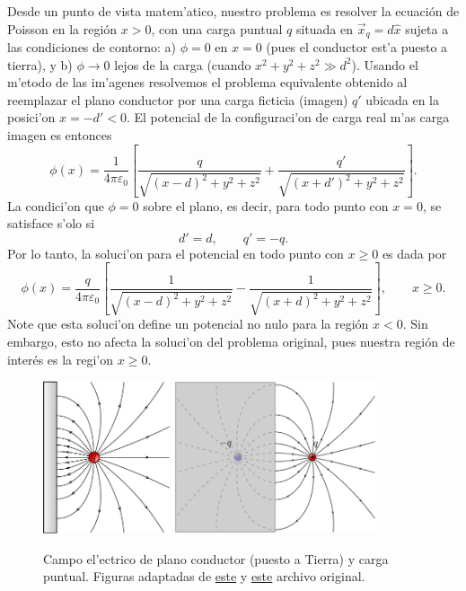 Desde un punto de vista matem'atico, nuestro problema es resolver la ecuación de Poisson en la región $x>0$, con una carga puntual $q$ situada en $\vec{x}_q=d\hat{x}$ sujeta a las condiciones de contorno: a) $\phi = 0 $ en $x=0$ (pues el conductor est'a puesto a tierra), y b) $\phi\rightarrow 0$ lejos de la carga (cuando $x^2 + y^2 + z^2 \gg d^2$). Usando el m'etodo de las im'agenes resolvemos el problema equivalente obtenido al reemplazar el plano conductor por una carga ficticia (imagen) $q'$ ubicada en la posici'on $x=-d'<0$. El potencial de la configuraci'on de carga real m'as carga imagen es entonces
\begin{equation}
 \phi(x)=\frac{1}{4\pi\varepsilon_0}\left[\frac{q}{\sqrt{(x-d)^2+y^2+z^2}}+\frac
{q'}{\sqrt{(x+d')^2+y^2+z^2}}\right].
\end{equation}
La condici'on que $\phi=0$ sobre el plano, es decir, para todo punto con $x=0$,
se satisface s'olo si
\begin{equation}
 d'=d, \qquad q'=-q.
\end{equation}
Por lo tanto, la soluci'on para el potencial en todo punto con $x\ge 0$ es dada por
\begin{equation}
 \phi(x)=\frac{q}{4\pi\varepsilon_0}\left[\frac{1}{\sqrt{(x-d)^2+y^2+z^2}}-\frac
{1}{\sqrt{(x+d)^2+y^2+z^2}}\right], \qquad x\ge 0.
\end{equation}
Note que esta soluci'on define un potencial no nulo para la región $x < 0$. Sin embargo, esto no afecta la soluci'on del problema original, pues nuestra región de interés es la regi'on $x \ge 0$.
\begin{center}
\begin{figure}[H]
\centerline{\includegraphics[height=4.5cm]{fig/fig-metodo-imagen-plano-01.pdf}
\hspace{2cm}
\includegraphics[height=4.5cm]{fig/fig-metodo-imagen-plano-02.pdf}}
\caption{Campo el'ectrico de plano conductor (puesto a Tierra) y carga puntual. 
Figuras adaptadas de  \href{http://commons.wikimedia.org/wiki/File:VFPt_image_charge_plane_horizontal.svg}{este} y \href{http://commons.wikimedia.org/wiki/File:VFPt_image_charge_plane.svg}{este} archivo original.}
\label{fig:pyc}
\end{figure}
\end{center}

